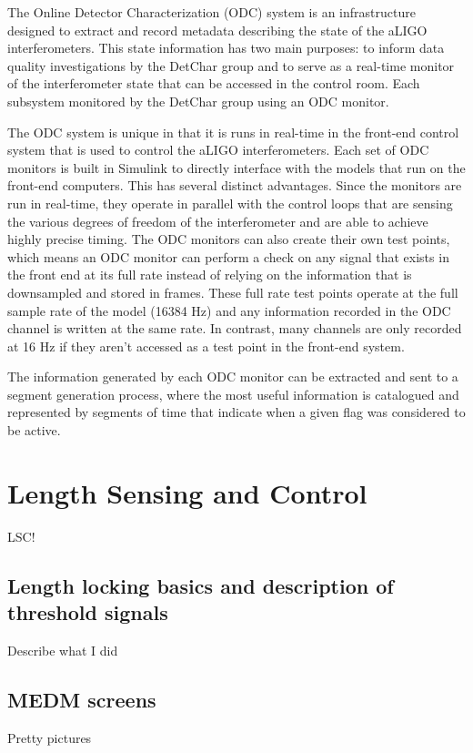 The Online Detector Characterization (ODC) system is an infrastructure designed to extract and record metadata describing the state of the aLIGO interferometers. This state information has two main purposes: to inform data quality investigations by the DetChar group and to serve as a real-time monitor of the interferometer state that can be accessed in the control room. Each subsystem monitored by the DetChar group using an ODC monitor.

The ODC system is unique in that it is runs in real-time in the front-end control system that is used to control the aLIGO interferometers. Each set of ODC monitors is built in Simulink to directly interface with the models that run on the front-end computers. This has several distinct advantages. 
Since the monitors are run in real-time, they operate in parallel with the control loops that are sensing the various degrees of freedom of the interferometer and are able to achieve highly precise timing. The ODC monitors can also create their own test points, which means an ODC monitor can perform a check on any signal that exists in the front end at its full rate instead of relying on the information that is downsampled and stored in frames. 
These full rate test points operate at the full sample rate of the model (16384 Hz) and any information recorded in the ODC channel is written at the same rate. In contrast, many channels are only recorded at 16 Hz if they aren't accessed as a test point in the front-end system. 

The information generated by each ODC monitor can be extracted and sent to a segment generation process, where the most useful information is catalogued and represented by segments of time that indicate when a given flag was considered to be active.  


\section{Length Sensing and Control}
LSC!

\subsection{Length locking basics and description of threshold signals}
Describe what I did

\subsection{MEDM screens}
Pretty pictures

